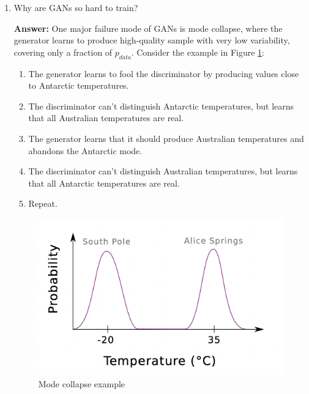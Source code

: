 \documentclass{article}
\newenvironment{QandA}{\begin{enumerate}[label=\arabic*.]}{\end{enumerate}}
\newenvironment{InnerQandA}{\begin{enumerate}[label=\roman*.]}{\end{enumerate}}
\newenvironment{answer}{\par\normalfont \textbf{Answer:}}{}
\newcommand{\KL}[2]{\text{KL}\left[#1 \Vert #2 \right]}
\begin{document}
\begin{QandA}
\begin{InnerQandA}
\begin{answer}
\begin{align*}
                &= -\log 4 + \KL{p_{data}}{\frac{p_{data} + p_{model}}{2}} + \KL{p_{model}}{\frac{p_{data} + p_{model}}{2}} \\
                &= -\log 4 + \text{JSD}\left[  p_{data}, p_{model} \right]
            \end{align*}
            where JSD is the Jenson Shannon Divergence. Since this is a non-negative quantity, when $G$ tries to minimize $V(G, D^*_G)$ it will push $\text{JSD}\left[  p_{data}, p_{model}\right]$ down to 0, which is achieved for $p_{model} = p_{data}$. In turn, this implies:
            \begin{align*}
                D^*_{G}(x) &= \frac{p_{data}(x)}{p_{data}(x) + p_{model}(x)} \underbrace{=}_{p_{model} = p_{data}} = \frac{1}{2} \\
                V(G*, D^*_G) &= -\log 4 + \text{JSD}\left[  p_{data}, p_{model} \right] \underbrace{=}_{p_{model} = p_{data}} -\log4
            \end{align*}
        \end{answer}

        \item Why are GANs so hard to train?
        \begin{answer}
            One major failure mode of GANs is mode collapse, where the generator learns to produce high-quality sample with very low variability, covering only a fraction of $p_{data}$. Consider the example in Figure \ref{fig:mode-collapse}:
            \begin{enumerate}[label=\arabic*.]
                \item The generator learns to fool the discriminator by producing values close to Antarctic temperatures. 
                \item The discriminator can't distinguish Antarctic temperatures, but learns that all Australian temperatures are real.
                \item The generator learns that it should produce Australian temperatures and abandons the Antarctic mode. 
                \item The discriminator can't distinguish Australian temperatures, but learns that all Antarctic temperatures are real. 
                \item Repeat.
            \end{enumerate}
            \begin{figure}[h!]
                \centering
                \includegraphics[width=0.5\linewidth]{img/mode-collapse.png}
                \caption{Mode collapse example}
                \label{fig:mode-collapse}
            \end{figure}


\end{answer}
\end{InnerQandA}
\end{QandA}
\end{document}
